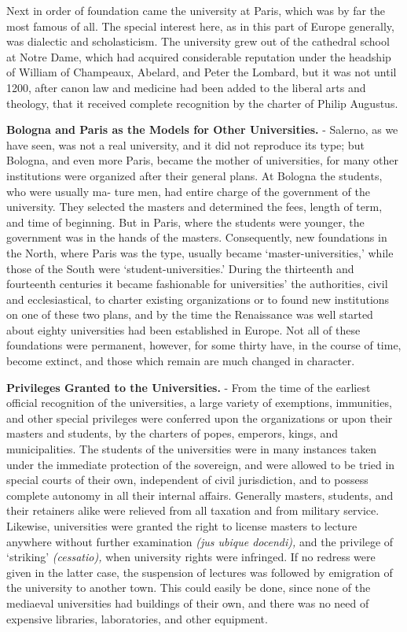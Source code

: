 \documentclass[]{book}
\begin{document}
Next in order of foundation came the university at Paris, which was by far the most famous of all. The special interest here, as in this part of Europe generally, was dialectic and scholasticism. The university grew out of the cathedral school at Notre Dame, which had acquired considerable reputation under the headship of William of Champeaux, Abelard, and Peter the Lombard, but it was not until 1200, after canon law and medicine had been added to the liberal arts and theology, that it received complete recognition by the charter of Philip Augustus.

\textbf{Bologna and Paris as the Models for Other Universities.} - Salerno, as we have seen, was not a real university, and it did not reproduce its type; but Bologna, and even more Paris, became the mother of universities, for many other institutions were organized after their general plans. At Bologna the students, who were usually ma- ture men, had entire charge of the government of the university. They selected the masters and determined the fees, length of term, and time of beginning. But in Paris, where the students were younger, the government was in the hands of the masters. Consequently, new foundations in the North, where Paris was the type, usually became `master-universities,' while those of the South were `student-universities.' During the thirteenth and fourteenth centuries it became fashionable for universities' the authorities, civil and ecclesiastical, to charter existing organizations or to found new institutions on one of these two plans, and by the time the Renaissance was well started about eighty universities had been established in Europe. Not all of these foundations were permanent, however, for some thirty have, in the course of time, become extinct, and those which remain are much changed in character.

\textbf{Privileges Granted to the Universities.} - From the time of the earliest official recognition of the universities, a large variety of exemptions, immunities, and other special privileges were conferred upon the organizations or upon their masters and students, by the charters of popes, emperors, kings, and municipalities. The students of the universities were in many instances taken under the immediate protection of the sovereign, and were allowed to be tried in special courts of their own, independent of civil jurisdiction, and to possess complete autonomy in all their internal affairs. Generally masters, students, and their retainers alike were relieved from all taxation and from military service. Likewise, universities were granted the right to license masters to lecture anywhere without further examination \emph{(jus ubique docendi),} and the privilege of `striking' \emph{(cessatio),} when university rights were infringed. If no redress were given in the latter case, the suspension of lectures was followed by emigration of the university to another town. This could easily be done, since none of the mediaeval universities had buildings of their own, and there was no need of expensive libraries, laboratories, and other equipment.
\end{document}
